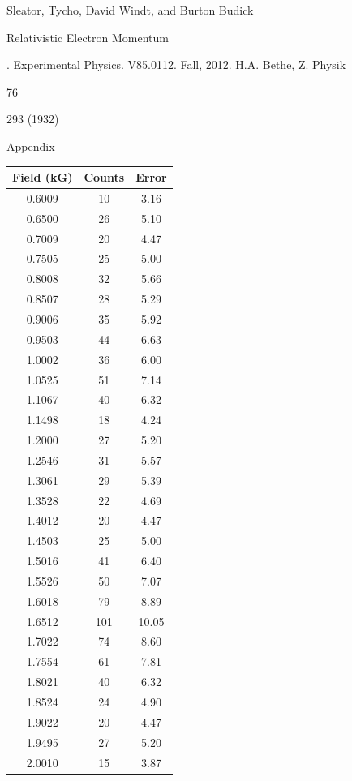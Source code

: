 \begin{thebibliography}{99}
Sleator, Tycho, David Windt, and Burton Budick \begin{em}Relativistic Electron Momentum\end{em}. Experimental Physics. V85.0112. Fall, 2012.
 H.A. Bethe, Z. Physik \begin{em} 76 \end{em} 293 (1932)
\end{thebibliography}

\newpage \LARGE{Appendix}

\begin{table}[h!]
\begin{minipage}[b]{0.45\linewidth}\centering
\begin{tabular}{|c|c|c|} \hline
Field	(kG)&	Counts	&	Error	\\	\hline
0.6009	&	10	&	3.16	\\	\hline
0.6500	&	26	&	5.10	\\	\hline
0.7009	&	20	&	4.47	\\	\hline
0.7505	&	25	&	5.00	\\	\hline
0.8008	&	32	&	5.66	\\	\hline
0.8507	&	28	&	5.29	\\	\hline
0.9006	&	35	&	5.92	\\	\hline
0.9503	&	44	&	6.63	\\	\hline
1.0002	&	36	&	6.00	\\	\hline
1.0525	&	51	&	7.14	\\	\hline
1.1067	&	40	&	6.32	\\	\hline
1.1498	&	18	&	4.24	\\	\hline
1.2000	&	27	&	5.20	\\	\hline
1.2546	&	31	&	5.57	\\	\hline
1.3061	&	29	&	5.39	\\	\hline
1.3528	&	22	&	4.69	\\	\hline
1.4012	&	20	&	4.47	\\	\hline
1.4503	&	25	&	5.00	\\	\hline
1.5016	&	41	&	6.40	\\	\hline
1.5526	&	50	&	7.07	\\	\hline
1.6018	&	79	&	8.89	\\	\hline
1.6512	&	101	&	10.05	\\	\hline
1.7022	&	74	&	8.60	\\	\hline
1.7554	&	61	&	7.81	\\	\hline
1.8021	&	40	&	6.32	\\	\hline
1.8524	&	24	&	4.90	\\	\hline
1.9022	&	20	&	4.47	\\	\hline
1.9495	&	27	&	5.20	\\	\hline
2.0010	&	15	&	3.87	\\	\hline
\end{tabular}


\end{minipage}
\end{table}
